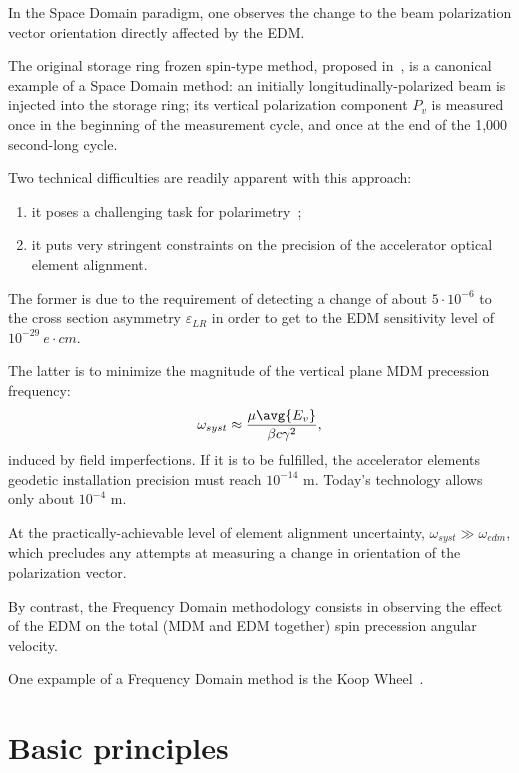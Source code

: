 \documentclass[a4paper]{jacow}
\newcommand{\w}{\omega}
\begin{document}
In the Space Domain paradigm, one observes the change to the beam polarization vector orientation
directly affected by the EDM.

The original storage ring frozen spin-type method, proposed in~\cite{BNL:Deuteron2008}, is a canonical example of
a Space Domain method: an initially longitudinally-polarized beam is injected into the storage ring; its vertical
polarization component $P_v$ is measured once in the beginning of the measurement cycle,
and once at the end of the 1,000 second-long cycle.

Two technical difficulties are readily apparent with this approach:
\begin{enumerate}
\item it poses a challenging task for polarimetry~\cite{Mane:SpinWheel};
\item it puts very stringent constraints on the precision of the accelerator optical element alignment.
\end{enumerate}

The former is due to the requirement of detecting a change of about $5\cdot 10^{-6}$ to the
cross section asymmetry $\varepsilon_{LR}$ in order to get to the EDM sensitivity level
of $10^{-29}~e\cdot cm$.~\cite[p.~18]{BNL:Deuteron2008}

The latter is to minimize the magnitude of the vertical plane
MDM precession frequency:~\cite[p.~11]{BNL:Deuteron2008}
\begin{equation}\label{eq:BNL_syst_err}
\w_{syst} \approx \frac{\mu\avg{E_v}}{\beta c\gamma^2},
\end{equation}
induced by field imperfections. If it is to be fulfilled, the accelerator elements geodetic installation
precision must reach $10^{-14}$ m. Today's technology allows only about $10^{-4}$ m.

At the practically-achievable level of element alignment uncertainty, $\w_{syst} \gg \w_{edm}$,
which precludes any attempts at measuring a change in orientation of the polarization vector.

By contrast, the Frequency Domain methodology consists in observing the effect of the EDM on the total
(MDM and EDM together) spin precession angular velocity.

One expample of a Frequency Domain method is the Koop Wheel~\cite{Koop:SW}. 

\section{Basic principles}
\end{document}
